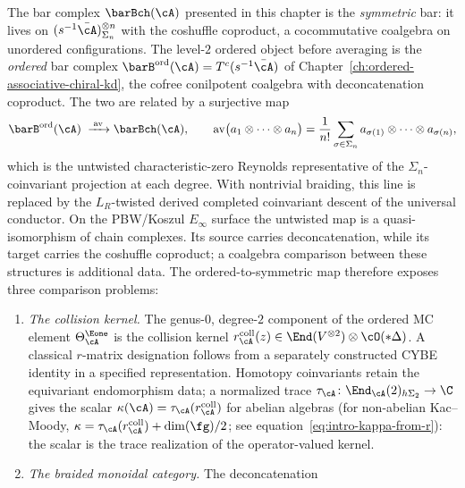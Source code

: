 \begin{remark}
\label{rem:bar-ordered-primacy}
The bar complex $\barBch(\cA)$ presented in this chapter is the
\emph{symmetric} bar: it lives on
$(s^{-1}\bar\cA)^{\otimes n}_{\Sigma_n}$ with the coshuffle
coproduct, a cocommutative coalgebra on unordered configurations.
The level-$2$ ordered object before averaging is the \emph{ordered} bar complex
$\barB^{\mathrm{ord}}(\cA) = T^c(s^{-1}\bar\cA)$ of
Chapter~\ref{ch:ordered-associative-chiral-kd}, the cofree
conilpotent coalgebra with deconcatenation coproduct. The two
are related by a surjective map
\begin{equation}\label{eq:bar-ordered-to-symmetric}
\barB^{\mathrm{ord}}(\cA)
\;\xrightarrow{\;\operatorname{av}\;}
\barBch(\cA),
\qquad
\operatorname{av}\bigl(a_1 \otimes \cdots \otimes a_n\bigr)
=
\frac{1}{n!}\sum_{\sigma \in \Sigma_n}
a_{\sigma(1)} \otimes \cdots \otimes a_{\sigma(n)},
\end{equation}
which is the untwisted characteristic-zero Reynolds representative of
the $\Sigma_n$-coinvariant projection at each degree. With nontrivial
braiding, this line is replaced by the $L_R$-twisted derived completed
coinvariant descent of the universal conductor. On the
PBW/Koszul $E_\infty$ surface the untwisted map is a quasi-isomorphism
of chain complexes.  Its source carries deconcatenation, while its
target carries the coshuffle coproduct; a coalgebra comparison between
these structures is additional data.  The ordered-to-symmetric map
therefore exposes three comparison problems:
\begin{enumerate}[label=\textup{(\roman*)}]
\item \emph{The collision kernel.} The genus-$0$, degree-$2$ component
 of the ordered MC element
 $\Theta_\cA^{\Eone}$ is the collision kernel
 $r_\cA^{\mathrm{coll}}(z)
 \in \End(V^{\otimes 2}) \otimes \cO(*\Delta)$.  A classical
 $r$-matrix designation follows from a separately constructed CYBE
 identity in a specified representation.  Homotopy coinvariants retain
 the equivariant endomorphism data; a normalized trace
 $\tau_\cA\colon\End_\cA(2)_{h\Sigma_2}\to\C$ gives the scalar
 $\kappa(\cA)=\tau_\cA(r_\cA^{\mathrm{coll}})$ for abelian algebras
 (for non-abelian Kac--Moody,
 $\kappa = \tau_\cA(r_\cA^{\mathrm{coll}}) + \dim(\fg)/2$;
 see equation~\eqref{eq:intro-kappa-from-r}): the
 scalar is the trace realization of the operator-valued kernel.
\item \emph{The braided monoidal category.} The deconcatenation

\end{enumerate}
\end{remark}
